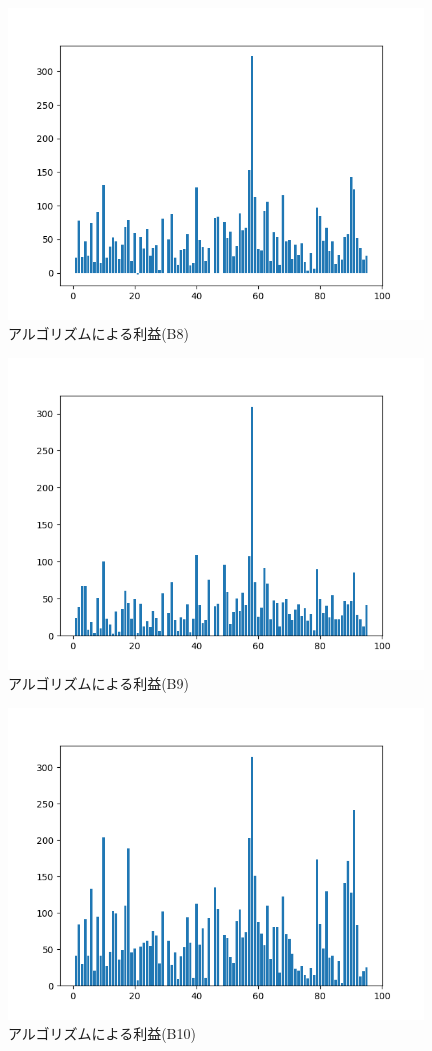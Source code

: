  \begin{figure}[H]
  \centering
  \includegraphics[width=110mm]{fig/bb_nikkei_saiteki.png}
  \caption{アルゴリズムによる利益(B8)}
  \label{fig:bbnikkeisai}
 \end{figure} 

 \begin{figure}[H]
  \centering
  \includegraphics[width=110mm]{fig/bb_nikkeiandfma_saiteki.png}
  \caption{アルゴリズムによる利益(B9)}
  \label{fig:b9sai}
 \end{figure}

 \begin{figure}[H]
  \centering
  \includegraphics[width=110mm]{fig/bb_nikkeiorfma_saiteki.png}
  \caption{アルゴリズムによる利益(B10)}
  \label{fig:b10sai}
 \end{figure}

